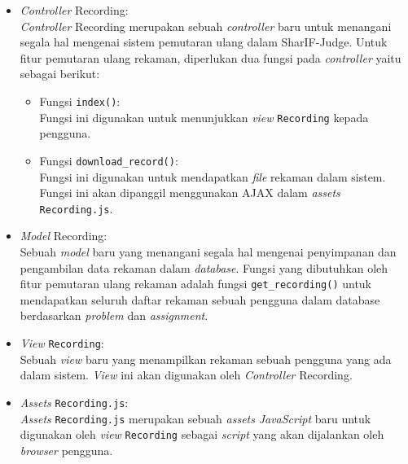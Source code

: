 \begin{itemize}
    \item \textit{Controller} Recording: \\
          \textit{Controller} Recording merupakan sebuah \textit{controller} baru untuk menangani segala hal mengenai sistem pemutaran ulang dalam SharIF-Judge. Untuk fitur pemutaran ulang rekaman, diperlukan dua fungsi pada \textit{controller} yaitu sebagai berikut:
          \begin{itemize}
              \item Fungsi \verb|index()|: \\
                    Fungsi ini digunakan untuk menunjukkan \textit{view} \verb|Recording| kepada pengguna.
              \item Fungsi \verb|download_record()|: \\
                    Fungsi ini digunakan untuk mendapatkan \textit{file} rekaman dalam sistem. Fungsi ini akan dipanggil menggunakan AJAX dalam \textit{assets} \verb|Recording.js|.
          \end{itemize}
    \item \textit{Model} Recording: \\
          Sebuah \textit{model} baru yang menangani segala hal mengenai penyimpanan dan pengambilan data rekaman dalam \textit{database}. Fungsi yang dibutuhkan oleh fitur pemutaran ulang rekaman adalah fungsi \verb|get_recording()| untuk mendapatkan seluruh daftar rekaman sebuah pengguna dalam database berdasarkan \textit{problem} dan \textit{assignment}.
    \item \textit{View} \verb|Recording|: \\
          Sebuah \textit{view} baru yang menampilkan rekaman sebuah pengguna yang ada dalam sistem. \textit{View} ini akan digunakan oleh \textit{Controller} Recording.
    \item \textit{Assets} \verb|Recording.js|: \\
          \textit{Assets} \verb|Recording.js| merupakan sebuah \textit{assets} \textit{JavaScript} baru untuk digunakan oleh \textit{view} \verb|Recording| sebagai \textit{script} yang akan dijalankan oleh \textit{browser} pengguna.
\end{itemize}